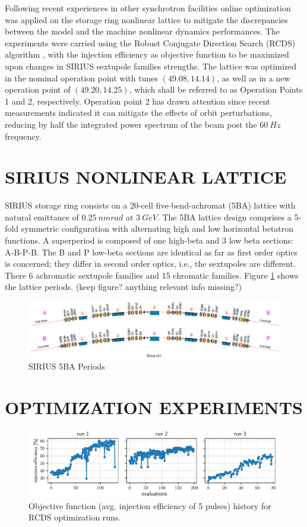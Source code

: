 \documentclass[a4paper,
               keeplastbox,   %
               ]{jacow}
\begin{document}
Following recent experiences in other synchrotron facilities \cite{Huang:2015, Liuzzo:IPAC2016-THPMR015, Olsson:IPAC2018-WEPAL047, yang:ipac2022-tupopt064} online optimization was applied on the storage ring nonlinear lattice to mitigate the discrepancies between the model and the machine nonlinear dynamics performances. The experiments were carried using the Robust Conjugate Direction Search (RCDS) algorithm \cite{Huang:2013}, with the injection efficiency as objective function to be maximized upon changes in SIRIUS sextupole families strengths. The lattice was optimized in the nominal operation point with tunes $(49.08, 14.14)$, as well as in a new operation point of $(49.20, 14.25)$, which shall be referred to as Operation Points 1 and 2, respectively. Operation point 2 has drawn attention since recent measurements indicated it can mitigate the effects of orbit perturbations, reducing by half the integrated power spectrum of the beam post the $60~\unit{Hz}$ frequency.   

\section{SIRIUS NONLINEAR LATTICE}
 SIRIUS storage ring consists on a 20-cell five-bend-achromat (5BA) lattice with natural emittance of $0.25~\si{nm rad}$ at $3~\unit{GeV}$. The 5BA lattice design comprises a 5-fold symmetric configuration with alternating high and low horizontal betatron functions. A superperiod is composed of one high-beta and 3 low beta sections: A-B-P-B. The B and P low-beta sections are identical as far as first order optics is concerned; they differ in second order optics, i.e., the sextupoles are different. There 6 achromatic sextupole families and 15 chromatic families. Figure \ref{fig:sirius} shows the lattice periods. (keep figure? anything relevant info missing?)
  \begin{figure}[!h]
     \centering
     \includegraphics[width=\columnwidth]{SI_superperiod.png}
     \caption{SIRIUS 5BA Periods}
     \label{fig:sirius}
 \end{figure}
\section{OPTIMIZATION EXPERIMENTS}
\begin{figure}[!h]
    \centering
    \includegraphics*[width=\textwidth]{oldtunes_runs123.pdf}
    \caption{Objective function (avg. injection efficiency of 5 pulses) history for RCDS optimization runs.}
    \label{fig:oldtunes_runs123}
\end{figure}
\end{document}

